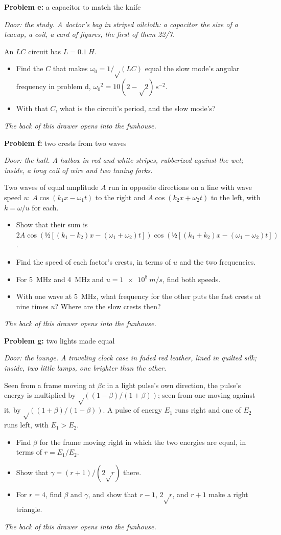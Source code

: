 \documentclass[11pt]{article}
\newcommand{\scene}[1]{\par{\itshape #1}\par}
\newcommand{\problem}[2]{\par\medskip\textbf{Problem #1:} #2\par\nopagebreak}
\newenvironment{parts}{\begin{itemize}[leftmargin=3.4em,labelwidth=2.8em,labelsep=0.6em,align=left,itemsep=3pt,topsep=4pt]}{\end{itemize}}
\newcommand{\pt}[1]{\item[\textbf{#1}]}
\newcommand{\half}{\text{½}}  %
\newcommand{\rt}{\text{√}}  %
\begin{document}
\problem{e}{a capacitor to match the knife}
\scene{Door: the study. A doctor's bag in striped oilcloth: a capacitor the size of a teacup, a coil, a card of figures, the first of them 22/7.}
An $LC$ circuit has $L = \SI{0.1}{H}$.
\begin{parts}
\pt{e-1} Find the $C$ that makes $\omega_0 = 1/\rt(LC)$ equal the slow mode's angular frequency in problem d, $\omega_0{}^2 = 10(2 - \rt2)\,\mathrm{s^{-2}}$.
\pt{e-2} With that $C$, what is the circuit's period, and the slow mode's?
\end{parts}
\scene{The back of this drawer opens into the funhouse.}

\clearpage
\problem{f}{two crests from two waves}
\scene{Door: the hall. A hatbox in red and white stripes, rubberized against the wet; inside, a long coil of wire and two tuning forks.}
Two waves of equal amplitude $A$ run in opposite directions on a line with wave speed $u$: $A\cos(k_1x - \omega_1t)$ to the right and $A\cos(k_2x + \omega_2t)$ to the left, with $k = \omega/u$ for each.
\begin{parts}
\pt{f-1} Show that their sum is $2A\cos(\half[(k_1 - k_2)x - (\omega_1 + \omega_2)t])\cos(\half[(k_1 + k_2)x - (\omega_1 - \omega_2)t])$.
\pt{f-2} Find the speed of each factor's crests, in terms of $u$ and the two frequencies.
\pt{f-3} For \SI{5}{MHz} and \SI{4}{MHz} and $u = \SI{1e8}{m/s}$, find both speeds.
\pt{f-4} With one wave at \SI{5}{MHz}, what frequency for the other puts the fast crests at nine times $u$? Where are the slow crests then?
\end{parts}
\scene{The back of this drawer opens into the funhouse.}

\problem{g}{two lights made equal}
\scene{Door: the lounge. A traveling clock case in faded red leather, lined in quilted silk; inside, two little lamps, one brighter than the other.}
Seen from a frame moving at $\beta c$ in a light pulse's own direction, the pulse's energy is multiplied by $\rt((1 - \beta)/(1 + \beta))$; seen from one moving against it, by $\rt((1 + \beta)/(1 - \beta))$. A pulse of energy $E_1$ runs right and one of $E_2$ runs left, with $E_1 > E_2$.
\begin{parts}
\pt{g-1} Find $\beta$ for the frame moving right in which the two energies are equal, in terms of $r = E_1/E_2$.
\pt{g-2} Show that $\gamma = (r + 1)/(2\rt r)$ there.
\pt{g-3} For $r = 4$, find $\beta$ and $\gamma$, and show that $r - 1$, $2\rt r$, and $r + 1$ make a right triangle.
\end{parts}
\scene{The back of this drawer opens into the funhouse.}
\end{document}
